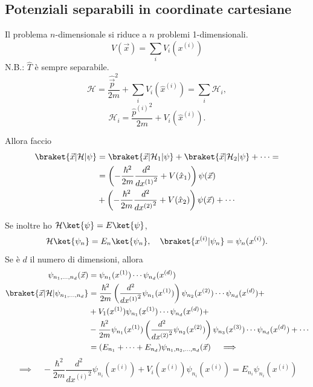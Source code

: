 \subsection{Potenziali separabili in coordinate cartesiane}
Il problema \( n \)-dimensionale si riduce a \( n \) problemi 1-dimensionali.
\[
V(\vec{x}) = \sum_i V_i(x^{(i)})
\]
N.B.: \( \hat{T} \) è sempre separabile.
\[
\mathcal{H} = \frac{{\hat{\vec{p}}}^2}{2m} + \sum_i V_i(\hat{x}^{(i)}) = \sum_i \mathcal{H}_i,
\]
\[
\mathcal{H}_i = \frac{{\hat{p}^{(i)}}^2}{2m} + V_i(\hat{x}^{(i)}).
\]

Allora faccio
\begin{align*}
\braket{\vec{x}|\mathcal{H}|\psi} &= \braket{\vec{x}|\mathcal{H}_1|\psi} + \braket{\vec{x}|\mathcal{H}_2|\psi} + \cdots = \\
&= \left( -\frac{\hbar^2}{2m} \frac{d^2}{d{x^{(1)}}^2} + V(\hat{x}_1) \right) \psi(\vec{x}) \\
&+ \left( -\frac{\hbar^2}{2m} \frac{d^2}{d{x^{(2)}}^2} + V(\hat{x}_2) \right) \psi(\vec{x}) + \cdots
\end{align*}

Se inoltre ho \( \mathcal{H} \ket{\psi} = E \ket{\psi} \),
\[
\mathcal{H} \ket{\psi_n} = E_n \ket{\psi_n}, \quad \braket{x^{(i)}|\psi_n} = \psi_n(x^{(i)}).
\]
Se è \( d \) il numero di dimensioni, allora 
\begin{align*}
\psi_{n_1, \dots, n_d}(\vec{x}) &= \psi_{n_1}(x^{(1)}) \cdots \psi_{n_d}(x^{(d)}) \\
\braket{\vec{x}|\mathcal{H}|\psi_{n_1, \dots, n_d}}  &= \frac{\hbar^2}{2m} \left( \frac{d^2}{d{x^{(1)}}^2} \psi_{n_1}(x^{(1)}) \right) \psi_{n_2}(x^{(2)}) \cdots \psi_{n_d}(x^{(d)}) + \\
&+ V_1(x^{(1)}) \psi_{n_1}(x^{(1)}) \cdots \psi_{n_d}(x^{(d)}) + \\
&- \frac{\hbar^2}{2m} \psi_{n_1}(x^{(1)}) \left( \frac{d^2}{d{x^{(2)}}^2} \psi_{n_2}(x^{(2)}) \right) \psi_{n_3}(x^{(3)}) \cdots \psi_{n_d}(x^{(d)}) + \cdots \\
&= (E_{n_1} + \cdots + E_{n_d}) \psi_{n_1, n_2, \dots, n_d}(\vec{x}) \quad \implies
\end{align*}
\[
\implies \quad -\frac{\hbar^2}{2m} \frac{d^2}{d{x^{(i)}}^2} \psi_{n_i}(x^{(i)}) + V_i(x^{(i)})\psi_{n_i}(x^{(i)}) = E_{n_i} \psi_{n_i}(x^{(i)})
\]